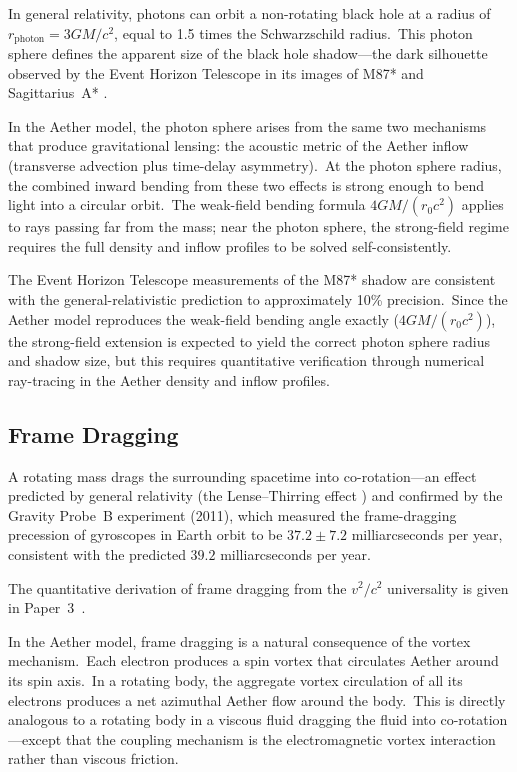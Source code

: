 ﻿\documentclass[12pt,letterpaper]{article}
\begin{document}
In general relativity, photons can orbit a non-rotating black hole at a radius of
$r_{\mathrm{photon}} = 3GM/c^2$, equal to 1.5 times the Schwarzschild radius.\ This photon sphere
defines the apparent size of the black hole shadow---the dark silhouette observed by
the Event Horizon Telescope in its images of M87* \cite{eht2019} and Sagittarius~A* \cite{eht2022}.

In the Aether model, the photon sphere arises from the same two mechanisms that produce
gravitational lensing: the acoustic metric of the Aether inflow (transverse
advection plus time-delay asymmetry).\ At the photon sphere radius, the combined
inward bending from these two
effects is strong enough to bend light into a circular orbit.\ The weak-field bending
formula $4GM/(r_0 c^2)$ applies to rays passing far from the mass; near the photon
sphere, the strong-field regime requires the full density and inflow profiles to be solved
self-consistently.

The Event Horizon Telescope measurements of the M87* shadow are consistent with the
general-relativistic prediction to approximately 10\% precision.\ Since the Aether model
reproduces the weak-field bending angle exactly ($4GM/(r_0 c^2)$), the strong-field
extension is expected to yield the correct photon sphere radius and shadow size, but this
requires quantitative verification through numerical ray-tracing in the Aether density
and inflow profiles.


\subsection{Frame Dragging}

A rotating mass drags the surrounding spacetime into co-rotation---an effect predicted
by general relativity (the Lense--Thirring effect \cite{lense1918}) and confirmed by the Gravity Probe~B
experiment \cite{everitt2011} (2011), which measured the frame-dragging precession of gyroscopes in Earth
orbit to be $37.2 \pm 7.2$ milliarcseconds per year, consistent with the predicted
$39.2$ milliarcseconds per year.

The quantitative derivation of frame dragging from the $v^2/c^2$
universality is given in Paper~3~\cite{otto-gravity}.

In the Aether model, frame dragging is a natural consequence of the vortex mechanism.\ Each
electron produces a spin vortex that circulates Aether around its spin axis.\ In a rotating
body, the aggregate vortex circulation of all its electrons produces a net azimuthal Aether
flow around the body.\ This is directly analogous to a rotating body in a viscous fluid
dragging the fluid into co-rotation---except that the coupling mechanism is the
electromagnetic vortex interaction rather than viscous friction.
\end{document}
